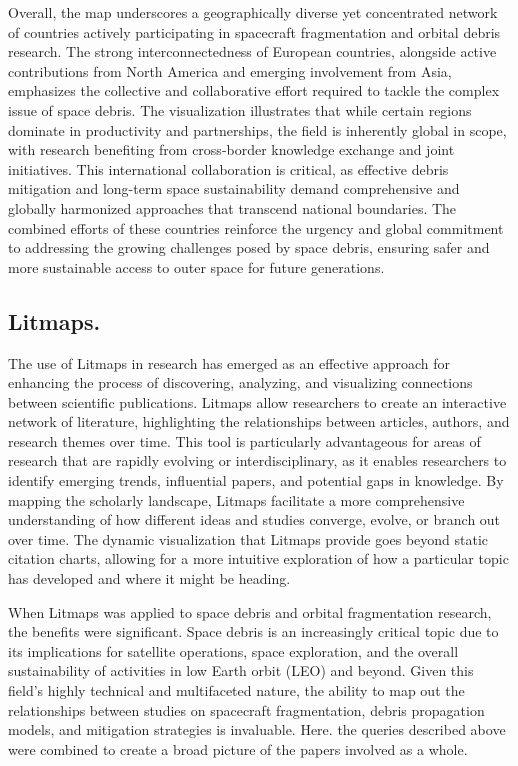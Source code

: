 \documentclass[journal ]{new-aiaa}
\begin{document}
Overall, the map underscores a geographically diverse yet concentrated network of countries actively participating in spacecraft fragmentation and orbital debris research. The strong interconnectedness of European countries, alongside active contributions from North America and emerging involvement from Asia, emphasizes the collective and collaborative effort required to tackle the complex issue of space debris. The visualization illustrates that while certain regions dominate in productivity and partnerships, the field is inherently global in scope, with research benefiting from cross-border knowledge exchange and joint initiatives. This international collaboration is critical, as effective debris mitigation and long-term space sustainability demand comprehensive and globally harmonized approaches that transcend national boundaries. The combined efforts of these countries reinforce the urgency and global commitment to addressing the growing challenges posed by space debris, ensuring safer and more sustainable access to outer space for future generations.

\subsection{Litmaps.}

The use of Litmaps in research has emerged as an effective approach for enhancing the process of discovering, analyzing, and visualizing connections between scientific publications. Litmaps allow researchers to create an interactive network of literature, highlighting the relationships between articles, authors, and research themes over time. This tool is particularly advantageous for areas of research that are rapidly evolving or interdisciplinary, as it enables researchers to identify emerging trends, influential papers, and potential gaps in knowledge. By mapping the scholarly landscape, Litmaps facilitate a more comprehensive understanding of how different ideas and studies converge, evolve, or branch out over time. The dynamic visualization that Litmaps provide goes beyond static citation charts, allowing for a more intuitive exploration of how a particular topic has developed and where it might be heading.

When Litmaps was applied to space debris and orbital fragmentation research, the benefits were significant. Space debris is an increasingly critical topic due to its implications for satellite operations, space exploration, and the overall sustainability of activities in low Earth orbit (LEO) and beyond. Given this field's highly technical and multifaceted nature, the ability to map out the relationships between studies on spacecraft fragmentation, debris propagation models, and mitigation strategies is invaluable. Here. the queries described above were combined to create a broad picture of the papers involved as a whole.
\end{document}
